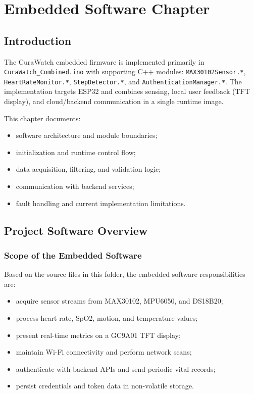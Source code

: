 \documentclass[12pt,a4paper]{report}
\begin{document}
\tableofcontents
\clearpage

\chapter{Embedded Software Chapter}

\section{Introduction}
The CuraWatch embedded firmware is implemented primarily in \texttt{CuraWatch\_Combined.ino} with supporting C++ modules:
\texttt{MAX30102Sensor.*}, \texttt{HeartRateMonitor.*}, \texttt{StepDetector.*}, and \texttt{AuthenticationManager.*}.
The implementation targets ESP32 and combines sensing, local user feedback (TFT display), and cloud/backend communication in a single runtime image.

This chapter documents:
\begin{itemize}
  \item software architecture and module boundaries;
  \item initialization and runtime control flow;
  \item data acquisition, filtering, and validation logic;
  \item communication with backend services;
  \item fault handling and current implementation limitations.
\end{itemize}

\section{Project Software Overview}
\subsection{Scope of the Embedded Software}
Based on the source files in this folder, the embedded software responsibilities are:
\begin{itemize}
  \item acquire sensor streams from MAX30102, MPU6050, and DS18B20;
  \item process heart rate, SpO2, motion, and temperature values;
  \item present real-time metrics on a GC9A01 TFT display;
  \item maintain Wi-Fi connectivity and perform network scans;
  \item authenticate with backend APIs and send periodic vital records;
  \item persist credentials and token data in non-volatile storage.
\end{itemize}
\end{document}
